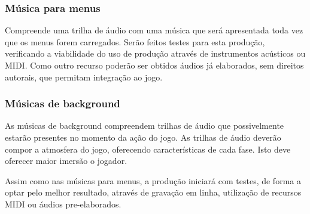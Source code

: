 \subsubsection{Música para menus}
Compreende uma trilha de áudio com uma música que será apresentada toda
 vez que os menus forem carregados. Serão feitos testes para esta produção, 
verificando a viabilidade do uso de produção através de instrumentos
 acústicos ou MIDI. Como outro recurso poderão ser obtidos áudios já
 elaborados, sem direitos autorais, que permitam integração ao jogo.

\subsubsection{Músicas de background}
As músicas de background compreendem trilhas de áudio que possivelmente
 estarão presentes no momento da ação do jogo. As trilhas de áudio 
deverão compor a atmosfera do jogo, oferecendo características de 
cada fase. Isto deve oferecer maior imersão o jogador.

Assim como nas músicas para menus, a produção iniciará com testes, de 
forma a optar pelo melhor resultado, através de gravação em linha,
 utilização de recursos MIDI ou áudios pre-elaborados.